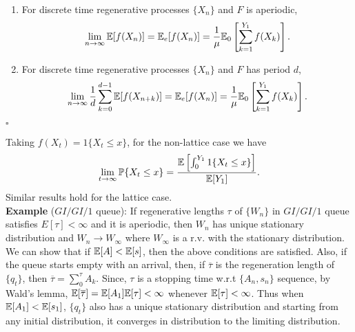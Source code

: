 \documentclass[all-lectures.tex]{subfiles}
\newcommand*{\QEDB}{\hfill\ensuremath{\square}}%
\begin{document}
\begin{thm}\ 
\begin{enumerate}
\item For discrete time regenerative processes $\{X_n\}$ and $F$ is aperiodic,
\begin{align*}
\lim_{n\to \infty} \mathbb{E}[f(X_n)] = \mathbb{E}_e[f(X_n)] = \frac{1}{\mu} \mathbb{E}_0\left[ \sum_{k=1}^{Y_1} f(X_k) \right].
\end{align*}
\item For discrete time regenerative processes $\{X_n\}$ and $F$ has period $d$,
\begin{align*}
\lim_{n\to \infty} \frac{1}{d} \sum_{k=0}^{d-1} \mathbb{E}[f(X_{n+k})] = \mathbb{E}_e[f(X_n)] = \frac{1}{\mu} \mathbb{E}_0\left[ \sum_{k=1}^{Y_1} f(X_k) \right]. 
\end{align*}
\end{enumerate}
\QEDB
\end{thm}
Taking $f(X_t) = 1\{X_t \leq x\}$, for the non-lattice case we have 
\begin{align*}
\lim_{t\to \infty} \mathbb{P}\{X_t \leq x\} = \frac{\mathbb{E}\left[ \int_0^{Y_1} 1\{X_t \leq x\}\right]}{\mathbb{E}[Y_1]}.
\end{align*}
Similar results hold for the lattice case. \\
\indent \textbf{Example} ($GI/GI/1$ queue): If regenerative lengths $\tau$ of $\{W_n\}$ in $GI/GI/1$ queue satisfies $E[\tau] < \infty$ and it is aperiodic, then $W_n$ has unique stationary distribution and $W_n \to W_\infty$ where $W_\infty$ is a r.v. with the stationary distribution. We can show that if $\mathbb{E}[A] < \mathbb{E}[s]$, then the above conditions are satisfied. Also, if the queue starts empty with an arrival, then, if $\overline{\tau}$ is the regeneration length of $\{q_t\}$, then $\overline{\tau} = \sum_0^{\tau} A_k$. Since, $\tau$ is a stopping time w.r.t $\{ A_n, s_n\}$ sequence, by Wald's lemma, $\mathbb{E}[\overline{\tau}]=\mathbb{E}[A_1]\mathbb{E}[\tau] < \infty$ whenever $\mathbb{E}[\tau] < \infty$. Thus when $\mathbb{E}[A_1]<\mathbb{E}[s_1]$, $\{q_t\}$ also has a unique stationary distribution and starting from any initial distribution,  it converges in distribution to the limiting distribution.
\end{document}
